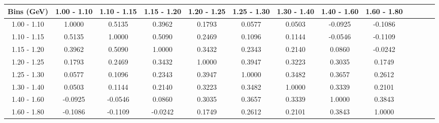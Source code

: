 \documentclass[aps, prd, reprint,showpacs,  preprintnumbers,amsmath,amssymb,superscriptaddress, nofootinbib]{revtex4-1}
\makeatletter
\renewenvironment{table}
  {\def\@captype{table}}
  {}
\makeatother
\begin{document}
\begin{table}
\begin{tabular}{ccccccccccccc}
\hline
    Bins (GeV) &  1.00 - 1.10 &  1.10 - 1.15 &  1.15 - 1.20 &  1.20 - 1.25 &  1.25 - 1.30 &  1.30 - 1.40 &  1.40 - 1.60 &  1.60 - 1.80 \\ 
\hline
  1.00 -  1.10  & 1.0000  & 0.5135  & 0.3962  & 0.1793  & 0.0577  & 0.0503  &-0.0925  &-0.1086 \\
  1.10 -  1.15  & 0.5135  & 1.0000  & 0.5090  & 0.2469  & 0.1096  & 0.1144  &-0.0546  &-0.1109 \\
  1.15 -  1.20  & 0.3962  & 0.5090  & 1.0000  & 0.3432  & 0.2343  & 0.2140  & 0.0860  &-0.0242 \\
  1.20 -  1.25  & 0.1793  & 0.2469  & 0.3432  & 1.0000  & 0.3947  & 0.3223  & 0.3035  & 0.1749 \\
  1.25 -  1.30  & 0.0577  & 0.1096  & 0.2343  & 0.3947  & 1.0000  & 0.3482  & 0.3657  & 0.2612 \\
  1.30 -  1.40  & 0.0503  & 0.1144  & 0.2140  & 0.3223  & 0.3482  & 1.0000  & 0.3339  & 0.2101 \\
  1.40 -  1.60  &-0.0925  &-0.0546  & 0.0860  & 0.3035  & 0.3657  & 0.3339  & 1.0000  & 0.3843 \\
  1.60 -  1.80  &-0.1086  &-0.1109  &-0.0242  & 0.1749  & 0.2612  & 0.2101  & 0.3843  & 1.0000 \\
\hline
\hline
\end{tabular}
\caption{Correlation matrix for bins of $d\sigma/dM(p\pi^{0})$.\\
NOTE: Result is for the $p\pi^{0}$ subsample with $T_{p}>100$\,MeV and $W<1.8$\,GeV.}
\label{tb:piz-Mppiz-cov-W18}
\end{table}

\vspace{0.3cm}
\end{document}
